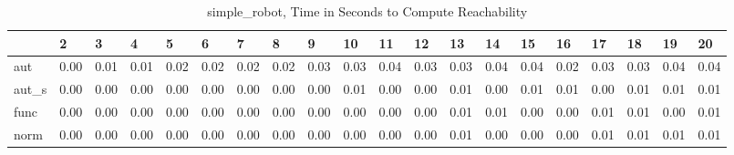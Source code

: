 \begin{table}
\centering
\caption{simple_robot, Time in Seconds to Compute Reachability}
\label{simple_robot_states_time}
\begin{tabular}{llllllllllllllllllll}
\toprule
{} &     2 &     3 &     4 &     5 &     6 &     7 &     8 &     9 &    10 &    11 &    12 &    13 &    14 &    15 &    16 &    17 &    18 &    19 &    20 \\
\midrule
aut   &  0.00 &  0.01 &  0.01 &  0.02 &  0.02 &  0.02 &  0.02 &  0.03 &  0.03 &  0.04 &  0.03 &  0.03 &  0.04 &  0.04 &  0.02 &  0.03 &  0.03 &  0.04 &  0.04 \\
aut\_s &  0.00 &  0.00 &  0.00 &  0.00 &  0.00 &  0.00 &  0.00 &  0.00 &  0.01 &  0.00 &  0.00 &  0.01 &  0.00 &  0.01 &  0.01 &  0.00 &  0.01 &  0.01 &  0.01 \\
func  &  0.00 &  0.00 &  0.00 &  0.00 &  0.00 &  0.00 &  0.00 &  0.00 &  0.00 &  0.00 &  0.00 &  0.01 &  0.01 &  0.00 &  0.00 &  0.01 &  0.01 &  0.00 &  0.01 \\
norm  &  0.00 &  0.00 &  0.00 &  0.00 &  0.00 &  0.00 &  0.00 &  0.00 &  0.00 &  0.00 &  0.00 &  0.01 &  0.00 &  0.00 &  0.00 &  0.01 &  0.01 &  0.01 &  0.01 \\
\bottomrule
\end{tabular}
\end{table}
